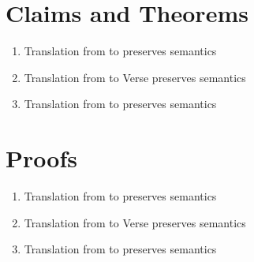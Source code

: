 \documentclass[]{article}
\begin{document}
{\section{Claims and Theorems}

\begin{enumerate}
    \item Translation from {\VMinus} to {\D} preserves semantics 
    \item Translation from {\VMinus} to Verse preserves semantics
    \item Translation from {\PPlus} to {\VMinus} preserves semantics 
\end{enumerate}

\section{Proofs}
\begin{enumerate}
    \item Translation from {\VMinus} to {\D} preserves semantics 
    \item Translation from {\VMinus} to Verse preserves semantics
    \item Translation from {\PPlus} to {\VMinus} preserves semantics 
\end{enumerate}
}
\end{document}
